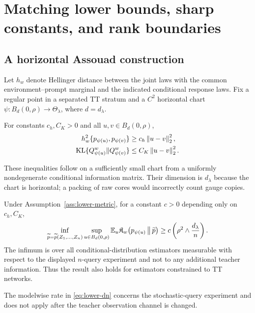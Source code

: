 \section{Matching lower bounds, sharp constants, and rank boundaries}
\label{sec:lower}

\subsection{A horizontal Assouad construction}

Let \(h_w\) denote Hellinger distance between the joint laws with the common environment--prompt marginal and the indicated conditional response laws. Fix a regular point in a separated TT stratum and a \(C^2\) horizontal chart
\(\psi:B_d(0,\rho)\to\Theta_\lambda\), where \(d=d_\lambda\).

\begin{assumption}
\label{ass:lower-metric}
For constants \(c_h,C_K>0\) and all \(u,v\in B_d(0,\rho)\),
\begin{align}
h_w^2\{p_{\psi(u)},p_{\psi(v)}\}&\ge c_h\left\lVert u-v\right\rVert_2^2,\label{eq:hell-lower}\\
\operatorname{KL}\{Q_{\psi(u)}^w\|Q_{\psi(v)}^w\}&\le C_K\left\lVert u-v\right\rVert_2^2.\label{eq:kl-upper}
\end{align}
\end{assumption}

These inequalities follow on a sufficiently small chart from a uniformly nondegenerate conditional information matrix. Their dimension is \(d_\lambda\) because the chart is horizontal; a packing of raw cores would incorrectly count gauge copies.

\begin{theorem}
\label{thm:lower}
Under Assumption~\ref{ass:lower-metric}, for a constant \(c>0\) depending only on \(c_h,C_K\),
\begin{equation}
\inf_{\widetilde p=\widetilde p(Z_1,\ldots,Z_n)}\sup_{u\in B_d(0,\rho)}
\mathbb E_u\mathfrak K_w\!\left(p_{\psi(u)}\,\middle\|\,\widetilde p\right)
\ge c\left(\rho^2\wedge\frac{d_\lambda}{n}\right).
\label{eq:lower-dn}
\end{equation}
The infimum is over all conditional-distribution estimators measurable with
respect to the displayed \(n\)-query experiment and not to any additional
teacher information.  Thus the result also holds for estimators constrained
to TT networks.
\end{theorem}

The modelwise rate in \cref{eq:lower-dn} concerns the stochastic-query
experiment and does not apply after the teacher observation channel is changed.

